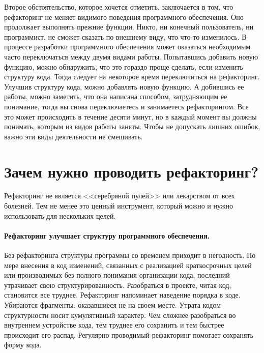 \documentclass{../../text-style}
\begin{document}
Второе обстоятельство, которое хочется отметить, заключается в том, что рефакторинг не меняет видимого поведения программного обеспечения. Оно продолжает выполнять прежние функции. Никто, ни конечный пользователь, ни программист, не сможет сказать по внешнему виду, что что-то изменилось. В процессе разработки программного обеспечения может оказаться необходимым часто переключаться между двумя видами работы. Попытавшись добавить новую функцию, можно обнаружить, что это гораздо проще сделать, если изменить структуру кода. Тогда следует на некоторое время переключиться на рефакторинг. Улучшив структуру кода, можно добавлять новую функцию. А добившись ее работы, можно заметить, что она написана способом, затрудняющим ее понимание, тогда вы снова переключаетесь и занимаетесь рефакторингом. Все это может происходить в течение десяти минут, но в каждый момент вы должны понимать, которым из видов работы заняты. Чтобы не допускать лишних ошибок, важно эти виды деятельности не смешивать.

\section{Зачем нужно проводить рефакторинг?}

Рефакторинг не является <<серебряной пулей>> или лекарством от всех болезней. Тем не менее это ценный инструмент, который можно и нужно использовать для нескольких целей.

\paragraph{Рефакторинг улучшает структуру программного обеспечения.} Без рефакторинга структуры программы со временем приходит в негодность. По мере внесения в код изменений, связанных с реализацией краткосрочных целей или производимых без полного понимания организации кода, последний утрачивает свою структурированность. Разобраться в проекте, читая код, становится все труднее. Рефакторинг напоминает наведение порядка в коде. Убираются фрагменты, оказавшиеся не на своем месте. Утрата кодом структурности носит кумулятивный характер. Чем сложнее разобраться во внутреннем устройстве кода, тем труднее его сохранить и тем быстрее происходит его распад. Регулярно проводимый рефакторинг помогает сохранять форму кода.
\end{document}

